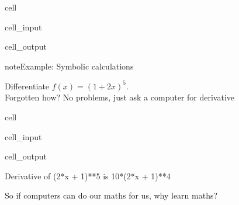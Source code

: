 \documentclass[letterpaper,10pt,english]{jupyterBook}
\begin{document}
\begin{sphinxuseclass}{cell}
\begin{sphinxVerbatimInput}
\begin{sphinxuseclass}{cell_input}
\end{sphinxuseclass}\end{sphinxVerbatimInput}
\begin{sphinxVerbatimOutput}

\begin{sphinxuseclass}{cell_output}

\end{sphinxuseclass}\end{sphinxVerbatimOutput}

\end{sphinxuseclass}
\begin{sphinxadmonition}{note}{Example: Symbolic calculations }

\sphinxAtStartPar
Differentiate \(f(x) = (1 + 2x)^5\).\\
Forgotten how?  No problems, just ask a computer for  derivative
\end{sphinxadmonition}

\begin{sphinxuseclass}{cell}\begin{sphinxVerbatimInput}

\begin{sphinxuseclass}{cell_input}
\begin{sphinxVerbatim}[commandchars=\\\{\}]
   
  
      
\end{sphinxVerbatim}

\end{sphinxuseclass}\end{sphinxVerbatimInput}
\begin{sphinxVerbatimOutput}

\begin{sphinxuseclass}{cell_output}
\begin{sphinxVerbatim}[commandchars=\\\{\}]
Derivative of (2*x + 1)**5 is 10*(2*x + 1)**4
\end{sphinxVerbatim}

\end{sphinxuseclass}\end{sphinxVerbatimOutput}

\end{sphinxuseclass}
\sphinxAtStartPar
So if computers can do our maths for us, why learn maths?
\end{document}
